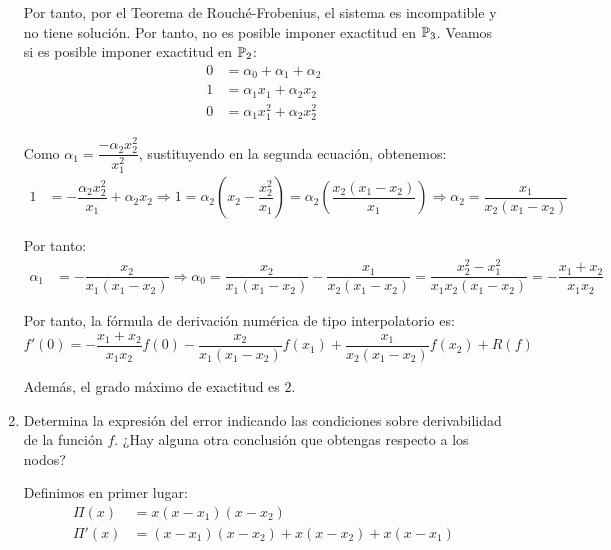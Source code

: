 \begin{ejercicio}
\begin{enumerate}
        Por tanto, por el Teorema de Rouché-Frobenius, el sistema es incompatible y no tiene solución. Por tanto, no es posible imponer exactitud en $\mathbb{P}_3$. Veamos si es posible imponer exactitud en $\mathbb{P}_2$:
        \begin{align*}
            0 &= \alpha_0 + \alpha_1 + \alpha_2 \\
            1 &= \alpha_1x_1 + \alpha_2x_2 \\
            0 &= \alpha_1x_1^2 + \alpha_2x_2^2
        \end{align*}

        Como $\alpha_1=\dfrac{-\alpha_2x_2^2}{x_1^2}$, sustituyendo en la segunda ecuación, obtenemos:
        \begin{align*}
            1 &= -\dfrac{\alpha_2x_2^2}{x_1} + \alpha_2x_2
            \Longrightarrow
            1=\alpha_2\left(x_2-\dfrac{x_2^2}{x_1}\right) = \alpha_2\left(\dfrac{x_2(x_1-x_2)}{x_1}\right)
            \Longrightarrow \alpha_2 = \dfrac{x_1}{x_2(x_1-x_2)}
        \end{align*}

        Por tanto:
        \begin{align*}
            \alpha_1 &= -\dfrac{x_2}{x_1(x_1-x_2)}
            \Longrightarrow
            \alpha_0 = \dfrac{x_2}{x_1(x_1-x_2)}-\dfrac{x_1}{x_2(x_1-x_2)}
            = \dfrac{x_2^2-x_1^2}{x_1x_2(x_1-x_2)} = -\dfrac{x_1+x_2}{x_1x_2}
        \end{align*}

        Por tanto, la fórmula de derivación numérica de tipo interpolatorio es:
        \begin{equation*}
            f'(0) = -\dfrac{x_1+x_2}{x_1x_2}f(0) -\dfrac{x_2}{x_1(x_1-x_2)}f(x_1) + \dfrac{x_1}{x_2(x_1-x_2)}f(x_2) + R(f)
        \end{equation*}

        Además, el grado máximo de exactitud es $2$.

        \item Determina la expresión del error indicando las condiciones sobre derivabilidad de la función $f$. ¿Hay alguna otra conclusión que obtengas respecto a los nodos?
        
        Definimos en primer lugar:
        \begin{align*}
            \Pi(x) &= x(x-x_1)(x-x_2)\\
            \Pi'(x) &= (x-x_1)(x-x_2) + x(x-x_2) + x(x-x_1)
        \end{align*}


\end{enumerate}
\end{ejercicio}
